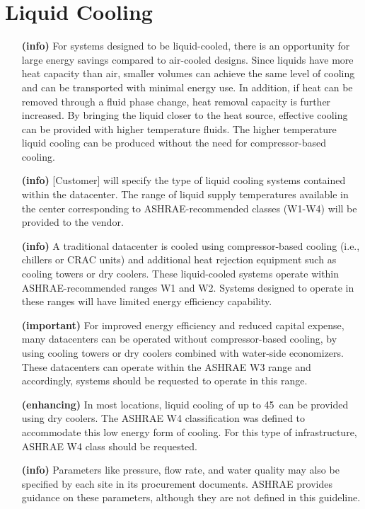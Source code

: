 \section{Liquid Cooling}

\begin{itemize}
\item[\textbf{(info)}]
For systems designed to be liquid-cooled, there is an opportunity for large energy 
savings compared to air-cooled designs.  Since liquids have more heat capacity than 
air, smaller volumes can achieve the same level of cooling and can be transported 
with minimal energy use.  In addition, if heat can be removed through a fluid phase 
change, heat removal capacity is further increased.  By bringing the liquid closer 
to the heat source, effective cooling can be provided with higher temperature fluids.  
The higher temperature liquid cooling can be produced without the need for 
compressor-based cooling.

\item[\textbf{(info)}]
[Customer] will specify the type of liquid cooling systems contained within the datacenter.  
The range of liquid supply temperatures available in the center corresponding to 
ASHRAE-recommended classes (W1-W4) will be provided to the vendor.  

\item[\textbf{(info)}]
A traditional datacenter is cooled using compressor-based cooling (i.e., chillers or 
CRAC units) and additional heat rejection equipment such as cooling towers or dry coolers.  
These liquid-cooled systems operate within ASHRAE-recommended ranges W1 and W2.  Systems 
designed to operate in these ranges will have limited energy efficiency capability.

\item[\textbf{(important)}]
For improved energy efficiency and reduced capital expense, many datacenters can be 
operated without compressor-based cooling, by using cooling towers or dry coolers 
combined with water-side economizers. These datacenters can operate within the ASHRAE 
W3 range and accordingly, systems should be requested to operate in this range.

\item[\textbf{(enhancing)}]
In most locations, liquid cooling of up to 45\celsius~can be provided using dry coolers.  
The ASHRAE W4 classification was defined to accommodate this low energy form of cooling.  
For this type of infrastructure, ASHRAE W4 class should be requested.  

\item[\textbf{(info)}]
Parameters like pressure, flow rate, and water quality may also be specified by each site 
in its procurement documents.  ASHRAE provides guidance on these parameters, although 
they are not defined in this guideline. 
\end{itemize}
 
